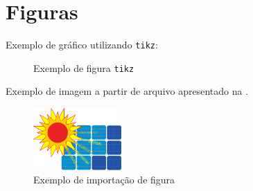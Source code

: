 \section{Figuras}
\lipsum[6]

Exemplo de gráfico utilizando \texttt{tikz}:
\begin{figure}[h]
    \centering
    
    \caption{Exemplo de figura \texttt{tikz}}
    \label{fig:exemplo}
\end{figure}


\lipsum[7]




Exemplo de imagem a partir de arquivo apresentado na .
\begin{figure}[h]
    \centering
    \includegraphics[width=0.3\textwidth, angle=20]{../class/figs/logo_capa}
    \caption{Exemplo de importação de figura}
    \label{fig:exemplo1}
\end{figure}

